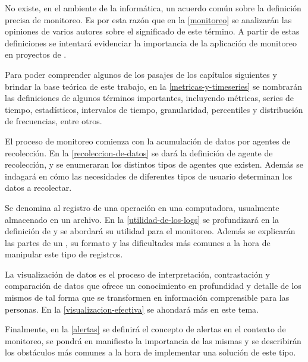 No existe, en el ambiente de la informática, un acuerdo común sobre la
definición precisa de monitoreo. Es por esta razón que en la \autoref{monitoreo}
se analizarán las opiniones de varios autores sobre el significado
de este término. A partir de estas definiciones se intentará evidenciar la
importancia de la aplicación de monitoreo en proyectos de .

Para poder comprender algunos de los pasajes de los capítulos siguientes y
brindar la base teórica de este trabajo, en la \autoref{metricas-y-timeseries}
se nombrarán las definiciones de algunos términos importantes, incluyendo
métricas, series de tiempo, estadísticos, intervalos de tiempo, granularidad,
percentiles y distribución de frecuencias, entre otros.

El proceso de monitoreo comienza con la acumulación de datos por agentes de
recolección. En la \autoref{recoleccion-de-datos} se dará la definición
de agente de recolección, y se enumeraran los distintos tipos de agentes que
existen. Además se indagará en cómo las necesidades de diferentes tipos de
usuario determinan los datos a recolectar.

Se denomina  al registro de una operación en una computadora, usualmente
almacenado en un archivo. En la \autoref{utilidad-de-los-logs} se profundizará
en la definición de  y se abordará su utilidad para el monitoreo.
Además se explicarán las partes de un , su formato y las dificultades más comunes a la hora de manipular este tipo de registros.

La visualización de datos es el proceso de interpretación, contrastación y
comparación de datos que ofrece un conocimiento en profundidad y detalle de
los mismos de tal forma que se transformen en información comprensible para las
personas. En la \autoref{visualizacion-efectiva} se ahondará más en este tema.

Finalmente, en la \autoref{alertas} se definirá el concepto de alertas en el
contexto de monitoreo, se pondrá en manifiesto la importancia de las mismas y
se describirán los obstáculos más comunes a la hora de implementar una solución
de este tipo.

